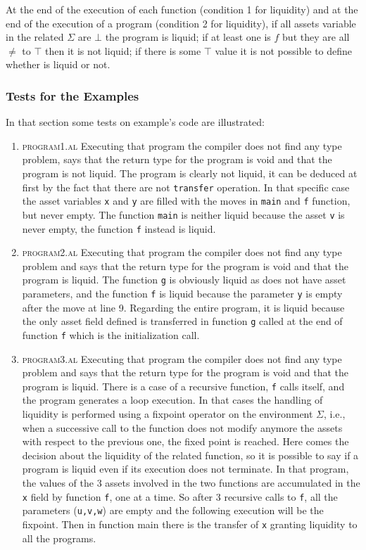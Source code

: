 \documentclass[11pt]{article} %
\begin{document}
\medskip

At the end of the execution of each function (condition 1 for liquidity) and at the end of the execution of a program (condition 2 for liquidity), if all assets variable in the related $\Sigma$ are $\bot$ the program is liquid; if at least one is $f$ but they are all $\neq$ to $\top$ then it is not liquid; if there is some $\top$ value it is not possible to define whether is liquid or not.

\subsubsection{Tests for the Examples}
\label{ssec:Test}
In that section some tests on example's code are illustrated:
\begin{enumerate}
\item \textsc{program1.al}	
Executing that program the compiler does not find any type problem, says that the return type for the program is void and that the program is not liquid. The program is clearly not liquid, it can be deduced at first by the fact that there are not \verb|transfer| operation. In that specific case the asset variables \verb|x| and \verb|y| are filled with the moves in \verb|main| and \verb|f| function, but never empty. The function \verb|main| is neither liquid because the asset \verb|v| is never empty, the function \verb|f| instead is liquid.
\item \textsc{program2.al}	
Executing that program the compiler does not find any type problem and says that the return type for the program is void and that the program is liquid. The function \verb|g| is obviously liquid as does not have asset parameters, and the function \verb|f| is liquid because the parameter \verb|y| is empty after the move at line 9. Regarding the entire program, it is liquid because the only asset field defined is transferred in function \verb|g| called at the end of function \verb|f| which is the initialization call.
\item \textsc{program3.al}	
Executing that program the compiler does not find any type problem and says that the return type for the program is void and that the program is liquid. There is a case of a recursive function, \verb|f| calls itself, and the program generates a loop execution. In that cases the handling of liquidity is performed using a fixpoint operator on the environment $\Sigma$, i.e., when a successive call to the function does not modify anymore the assets with respect to the previous one, the fixed point is reached. Here comes the decision about the liquidity of the related function, so it is possible to say if a program is liquid even if its execution does not terminate. In that program, the values of the 3 assets involved in the two functions are accumulated in the \verb|x| field by function \verb|f|, one at a time. So after 3 recursive calls to \verb|f|, all the parameters (\verb|u,v,w|) are empty and the following execution will be the fixpoint. Then in function main there is the transfer of \verb|x| granting liquidity to all the programs.

\end{enumerate}
\end{document}
